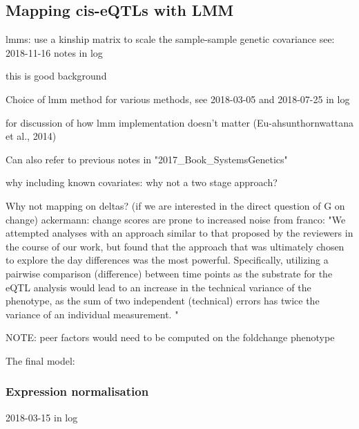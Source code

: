 \subsection{Mapping cis-eQTLs with LMM}

lmms: use a kinship matrix to scale the sample-sample genetic covariance
see: 2018-11-16 notes in log

this is good background

Choice of lmm method
for various methods, see 2018-03-05 and 2018-07-25 in log

for discussion of how lmm implementation doesn't matter (Eu-ahsunthornwattana et al., 2014)

Can also refer to previous notes in "2017\_Book\_SystemsGenetics"

why including known covariates: why not a two stage approach?

Why not mapping on deltas? (if we are interested in the direct question of G on change)
    ackermann: change scores are prone to increased noise
    from franco: "We attempted analyses with an approach similar to that proposed by the reviewers in the course of our work, but found that the approach that was ultimately chosen to explore the day differences was the most powerful. Specifically, utilizing a pairwise comparison (difference) between time points as the substrate for the eQTL analysis would lead to an increase in the technical variance of the phenotype, as the sum of two independent (technical) errors has twice the variance of an individual measurement. "

    NOTE: peer factors would need to be computed on the foldchange phenotype

The final model:

\subsubsection{Expression normalisation}

2018-03-15 in log


